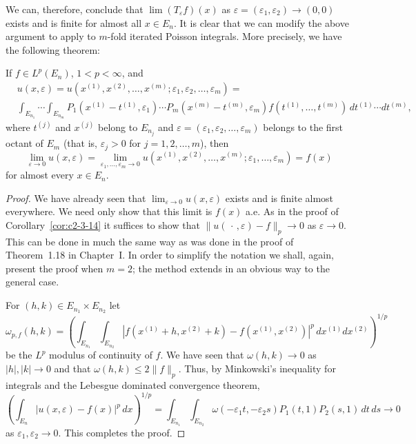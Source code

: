 We can, therefore, conclude that $\lim (T_\varepsilon f)(x)$ as $\varepsilon = (\varepsilon_1, \varepsilon_2) \to (0, 0)$ exists and is finite for almost all $x \in E_n$. It is clear that we can modify the above argument to apply to $m$-fold iterated Poisson integrals. More precisely, we have the following theorem:

\begin{theorem}\label{thm:c2-3-22}
If $f \in L^p(E_n)$, $1 < p < \infty$, and
\[
\begin{aligned}
&u(x, \varepsilon) = u(x^{(1)}, x^{(2)}, \dots, x^{(m)}; \varepsilon_1, \varepsilon_2, \dots, \varepsilon_m) = \\
&\int_{E_{n_1}} \cdots \int_{E_{n_m}} P_1(x^{(1)} - t^{(1)}, \varepsilon_1) \cdots P_m(x^{(m)} - t^{(m)}, \varepsilon_m) f(t^{(1)}, \dots, t^{(m)})\,dt^{(1)} \cdots dt^{(m)},
\end{aligned}
\]
where $t^{(j)}$ and $x^{(j)}$ belong to $E_{n_j}$ and $\varepsilon = (\varepsilon_1, \varepsilon_2, \dots, \varepsilon_m)$ belongs to the first octant of $E_m$ (that is, $\varepsilon_j > 0$ for $j = 1, 2, \dots, m$), then
\[
\lim_{\varepsilon \to 0} u(x, \varepsilon) = \lim_{\varepsilon_1, \dots, \varepsilon_m \to 0} u(x^{(1)}, x^{(2)}, \dots, x^{(m)}; \varepsilon_1, \dots, \varepsilon_m) = f(x)
\]
for almost every $x \in E_n$.
\end{theorem}

\begin{proof}
We have already seen that $\lim_{\varepsilon \to 0} u(x, \varepsilon)$ exists and is finite almost everywhere. We need only show that this limit is $f(x)$ a.e. As in the proof of Corollary~\ref{cor:c2-3-14} it suffices to show that $\|u(\,\cdot\,, \varepsilon) - f\|_p \to 0$ as $\varepsilon \to 0$. This can be done in much the same way as was done in the proof of Theorem~1.18 in Chapter~I. In order to simplify the notation we shall, again, present the proof when $m = 2$; the method extends in an obvious way to the general case.

For $(h, k) \in E_{n_1} \times E_{n_2}$ let
\[
\omega_{p,f}(h, k) = \left(\int_{E_{n_1}} \int_{E_{n_2}} |f(x^{(1)} + h, x^{(2)} + k) - f(x^{(1)}, x^{(2)})|^p\,dx^{(1)} dx^{(2)}\right)^{1/p}
\]
be the $L^p$ modulus of continuity of $f$. We have seen that $\omega(h, k) \to 0$ as $|h|, |k| \to 0$ and that $\omega(h, k) \leq 2\|f\|_p$. Thus, by Minkowski's inequality for integrals and the Lebesgue dominated convergence theorem,
\[
\left(\int_{E_n} |u(x, \varepsilon) - f(x)|^p\,dx\right)^{1/p} = \int_{E_{n_1}} \int_{E_{n_2}} \omega(-\varepsilon_1 t, -\varepsilon_2 s) P_1(t, 1) P_2(s, 1)\,dt\,ds \to 0
\]
as $\varepsilon_1, \varepsilon_2 \to 0$. This completes the proof.
\end{proof}

